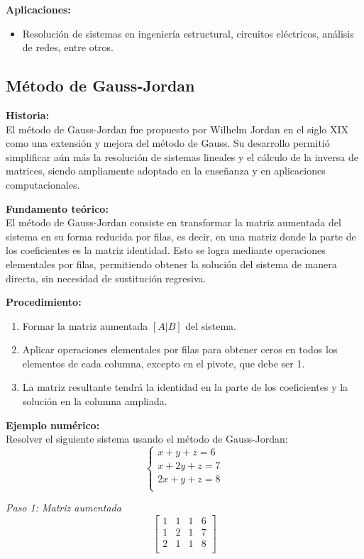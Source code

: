 \documentclass[12pt]{article}
\begin{document}
\textbf{Aplicaciones:}
\begin{itemize}
    \item Resolución de sistemas en ingeniería estructural, circuitos eléctricos, análisis de redes, entre otros.
\end{itemize}

\subsection{Método de Gauss-Jordan}

\textbf{Historia:}  \\
El método de Gauss-Jordan fue propuesto por Wilhelm Jordan en el siglo XIX como una extensión y mejora del método de Gauss. Su desarrollo permitió simplificar aún más la resolución de sistemas lineales y el cálculo de la inversa de matrices, siendo ampliamente adoptado en la enseñanza y en aplicaciones computacionales.

\textbf{Fundamento teórico:}  \\
El método de Gauss-Jordan consiste en transformar la matriz aumentada del sistema en su forma reducida por filas, es decir, en una matriz donde la parte de los coeficientes es la matriz identidad. Esto se logra mediante operaciones elementales por filas, permitiendo obtener la solución del sistema de manera directa, sin necesidad de sustitución regresiva.

\textbf{Procedimiento:}
\begin{enumerate}
    \item Formar la matriz aumentada $[A|B]$ del sistema.
    \item Aplicar operaciones elementales por filas para obtener ceros en todos los elementos de cada columna, excepto en el pivote, que debe ser 1.
    \item La matriz resultante tendrá la identidad en la parte de los coeficientes y la solución en la columna ampliada.
\end{enumerate}

\textbf{Ejemplo numérico:}  \\
Resolver el siguiente sistema usando el método de Gauss-Jordan:
\[
\begin{cases}
x + y + z = 6 \\
x + 2y + z = 7 \\
2x + y + z = 8 \\
\end{cases}
\]

\textit{Paso 1: Matriz aumentada}
\[
\left[
\begin{array}{ccc|c}
1 & 1 & 1 & 6 \\
1 & 2 & 1 & 7 \\
2 & 1 & 1 & 8 \\
\end{array}
\right]
\]
\end{document}
